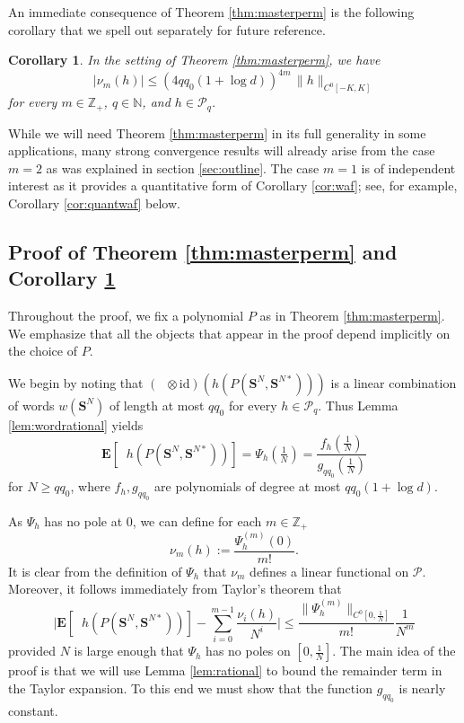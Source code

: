 \documentclass[10pt,reqno]{amsart}
\newtheorem{cor}[thm]{Corollary}
\theoremstyle{definition}
\theoremstyle{remark}
\numberwithin{equation}{section}
\numberwithin{figure}{section}
\numberwithin{table}{section}
\newcommand{\ntrD}{\mathop{\mathrm{tr}_D}}
\newcommand{\ntrND}{\mathop{\mathrm{tr}_{DN}}}
\newcommand{\EE}{\mathbf{E}}
\begin{document}
An immediate consequence of Theorem \ref{thm:masterperm} is the following 
corollary that we spell out separately for future reference.

\begin{cor}
\label{cor:linfunbd}
In the setting of Theorem \ref{thm:masterperm}, we have
$$
	|\nu_m(h)| \le (4qq_0(1+\log d))^{4m}\,\|h\|_{C^0[-K,K]}
$$
for every $m\in\mathbb{Z}_+$, $q\in\mathbb{N}$, and $h\in\mathcal{P}_q$.
\end{cor}

While we will need Theorem \ref{thm:masterperm} in its full generality in 
some applications, many strong convergence results will already arise from 
the case $m=2$ as was explained in section \ref{sec:outline}. The case 
$m=1$ is of independent interest as 
it provides a quantitative form of Corollary \ref{cor:waf}; see, for
example, Corollary \ref{cor:quantwaf} below.


\subsection{Proof of Theorem \ref{thm:masterperm} and
Corollary \ref{cor:linfunbd}}

Throughout the proof, we fix a polynomial $P$ as in Theorem 
\ref{thm:masterperm}. We emphasize that all the objects that appear in the 
proof depend implicitly on the choice of $P$.

We begin by noting that
$({\ntrD}\otimes\mathrm{id})(h(P(\boldsymbol{S}^N,\boldsymbol{S}^{N*})))$ 
is a linear combination of words $w(\boldsymbol{S}^N)$ of length at most 
$qq_0$ for every $h\in\mathcal{P}_q$.
Thus Lemma \ref{lem:wordrational} yields
$$
	\EE[\ntrND h(P(\boldsymbol{S}^N,\boldsymbol{S}^{N*}))]
	=
	\Psi_h(\tfrac{1}{N}) = \frac{f_h(\frac{1}{N})}{g_{qq_0}(\frac{1}{N})}
$$
for $N\ge qq_0$,
where $f_h,g_{qq_0}$ are polynomials of degree at most $qq_0(1+\log d)$.

As $\Psi_h$ has no pole at $0$, we can define for each 
$m\in\mathbb{Z}_+$
$$
	\nu_m(h) := \frac{\Psi_h^{(m)}(0)}{m!}.
$$
It is clear from the definition of $\Psi_h$ that $\nu_m$ defines a linear 
functional on $\mathcal{P}$. Moreover, it follows immediately from 
Taylor's theorem that
\begin{equation}
\label{eq:taylor}
	\bigg|\EE[\ntrND h(P(\boldsymbol{S}^N,\boldsymbol{S}^{N*}))]
	-
	\sum_{i=0}^{m-1} \frac{\nu_i(h)}{N^i}
	\bigg|
	\le
	\frac{\|\Psi_h^{(m)}\|_{C^0[0,\frac{1}{N}]}}{m!}
	\frac{1}{N^m}
\end{equation}
provided $N$ is large enough that $\Psi_h$ has no poles on 
$[0,\frac{1}{N}]$.
The main idea of the proof is that we will use Lemma \ref{lem:rational} to 
bound the remainder term in the Taylor expansion. To this end we must show
that the function $g_{qq_0}$ is nearly constant.
\end{document}
